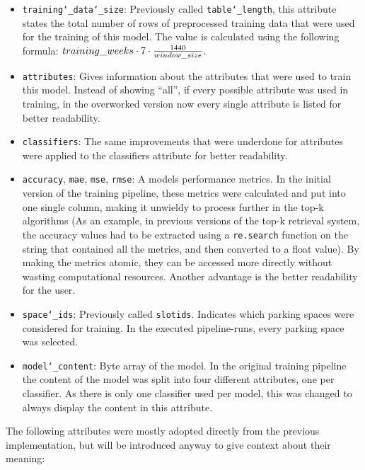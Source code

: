 \begin{itemize}
\item \texttt{training\char`_data\char`_size}: Previously called \texttt{table\char`_length}, this attribute states the total number of rows of preprocessed training data that were used for the training of this model. The value is calculated using the following formula: $training\char`_weeks \cdot 7 \cdot \frac{1440}{window\char`_size}$.
\item  \texttt{attributes}: Gives information about the attributes that were used to train this model. Instead of showing “all”, if every possible attribute was used in training, in the overworked version now every single attribute is listed for better readability. 
\item  \texttt{classifiers}:  The same improvements that were underdone for attributes were applied to the classifiers attribute for better readability. 
\item  \texttt{accuracy}, \texttt{mae}, \texttt{mse}, \texttt{rmse}: A models performance metrics. In the initial version of the training pipeline, these metrics were calculated and put into one single column, making it unwieldy to process further in the top-k algorithms (As an example, in previous versions of the top-k retrieval system, the accuracy values had to be extracted using a \texttt{re.search} function on the string that contained all the metrics, and then converted to a float value). By making the metrics atomic, they can be accessed more directly without wasting computational resources. Another advantage is the better readability for the user.
\item \texttt{space\char`_ids}: Previously called \texttt{slotids}.
Indicates which parking spaces were considered for training. In the executed pipeline-runs, every parking space was selected.
\item  \texttt{model\char`_content}: Byte array of the model. In the original training pipeline the content of the model was split into four different attributes, one per classifier. As there is only one classifier used per model, this was changed to always display the content in this attribute.
\end{itemize}

The following attributes were mostly adopted directly from the previous implementation, but will be introduced anyway to give context about their meaning:

